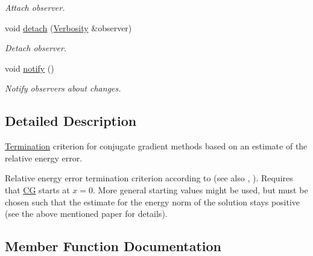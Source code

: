 \begin{DoxyCompactItemize}
\begin{DoxyCompactList}\small\item\em Attach observer. \end{DoxyCompactList}\item 
void \hyperlink{classSpacy_1_1Mixin_1_1MixinConnection_adda739590c487679c26f60e50aedb73f}{detach} (\hyperlink{classSpacy_1_1Mixin_1_1Verbosity_aefe2f237b0456c4bced001fbfa75f92e}{Verbosity} \&observer)\hypertarget{classSpacy_1_1Mixin_1_1MixinConnection_adda739590c487679c26f60e50aedb73f}{}\label{classSpacy_1_1Mixin_1_1MixinConnection_adda739590c487679c26f60e50aedb73f}

\begin{DoxyCompactList}\small\item\em Detach observer. \end{DoxyCompactList}\item 
void \hyperlink{classSpacy_1_1Mixin_1_1MixinConnection_a1ddeaa78a3bb4a38c2cca36d1f99fe36}{notify} ()\hypertarget{classSpacy_1_1Mixin_1_1MixinConnection_a1ddeaa78a3bb4a38c2cca36d1f99fe36}{}\label{classSpacy_1_1Mixin_1_1MixinConnection_a1ddeaa78a3bb4a38c2cca36d1f99fe36}

\begin{DoxyCompactList}\small\item\em Notify observers about changes. \end{DoxyCompactList}\end{DoxyCompactItemize}


\subsection{Detailed Description}
\hyperlink{namespaceSpacy_1_1CG_1_1Termination}{Termination} criterion for conjugate gradient methods based on an estimate of the relative energy error. 

Relative energy error termination criterion according to \cite{Strakos2005} (see also \cite{Hestenes1952}, \cite{Arioli2004}). Requires that \hyperlink{namespaceSpacy_1_1CG}{CG} starts at $ x = 0 $. More general starting values might be used, but must be chosen such that the estimate for the energy norm of the solution stays positive (see the above mentioned paper for details). 

\subsection{Member Function Documentation}

